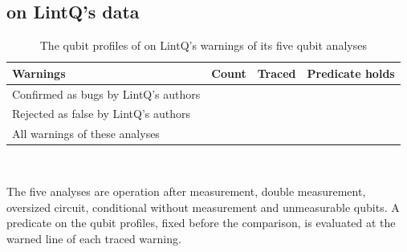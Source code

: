 \subsection{\tool{} on LintQ's data}

\begin{table}[t]
  \centering
  \caption{The qubit profiles of \tool{} on LintQ's warnings of its five qubit analyses}
  \label{tab:lintq}
  \footnotesize\setlength{\tabcolsep}{4pt}\renewcommand{\arraystretch}{1.12}
  \newcommand{\sep}{\arrayrulecolor{black!25}\hline\arrayrulecolor{black}}
  \begin{tabular}{@{}l r r r@{}}
    \toprule
    \textbf{Warnings} & \textbf{Count} & \textbf{Traced} & \textbf{Predicate holds} \\
    \midrule
    Confirmed as bugs by LintQ's authors & \numLqQubitTp{} & \numLqQubitTraced{} & \numLqQubitExposed{} \\ \sep
    Rejected as false by LintQ's authors & \numLqFpWarnings{} & \numLqFpTraced{} & \numLqFpFires{} \\ \sep
    All warnings of these analyses & \numLqSarifWarnings{} & \numLqSarifTraced{} & \numLqSarifFires{} \\
    \bottomrule
  \end{tabular}\\[3pt]
  \begin{minipage}{\columnwidth}\footnotesize
  The five analyses are operation after measurement, double measurement, oversized circuit, conditional without
  measurement and unmeasurable qubits. A predicate on the qubit profiles, fixed before the comparison, is evaluated at
  the warned line of each traced warning.
  \end{minipage}
\end{table}

